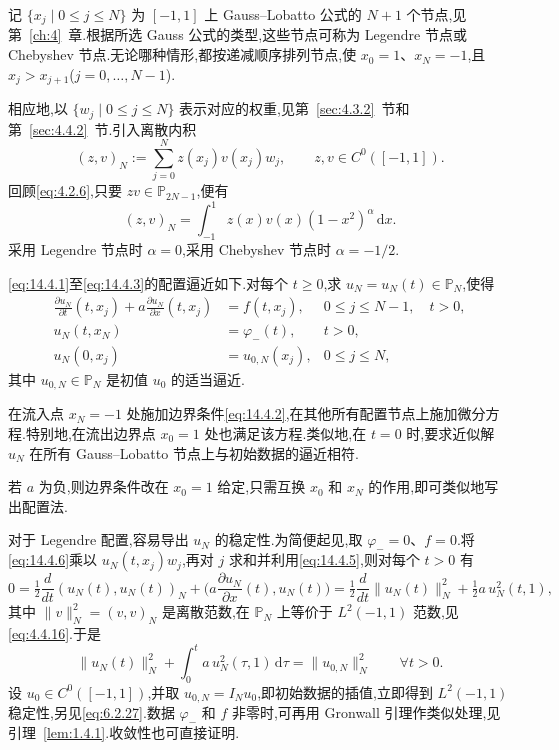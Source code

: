 记 \(\{x_j\mid 0\le j\le N\}\) 为 \([-1,1]\) 上 Gauss--Lobatto 公式的 \(N+1\) 个节点,见第~\ref{ch:4}~章.根据所选 Gauss 公式的类型,这些节点可称为 Legendre 节点或 Chebyshev 节点.无论哪种情形,都按递减顺序排列节点,使 \(x_0=1\)、\(x_N=-1\),且 \(x_j>x_{j+1}\)(\(j=0,\ldots,N-1\)).

相应地,以 \(\{w_j\mid 0\le j\le N\}\) 表示对应的权重,见第~\ref{sec:4.3.2}~节和第~\ref{sec:4.4.2}~节.引入离散内积
\begin{equation}\label{eq:14.4.4}
  (z,v)_N:=\sum_{j=0}^N z(x_j)v(x_j)w_j,\qquad z,v\in C^0([-1,1]).
\end{equation}
回顾\eqref{eq:4.2.6},只要 \(zv\in\mathbb P_{2N-1}\),便有
\begin{equation}\label{eq:14.4.5}
  (z,v)_N=\int_{-1}^1 z(x)v(x)(1-x^2)^\alpha\,\mathrm dx.
\end{equation}
采用 Legendre 节点时 \(\alpha=0\),采用 Chebyshev 节点时 \(\alpha=-1/2\).

\eqref{eq:14.4.1}至\eqref{eq:14.4.3}的配置逼近如下.对每个 \(t\ge0\),求 \(u_N=u_N(t)\in\mathbb P_N\),使得
\begin{align}
  \frac{\partial u_N}{\partial t}(t,x_j)
       +a\frac{\partial u_N}{\partial x}(t,x_j)&=f(t,x_j),
          &0\le j\le N-1,\quad t>0,\label{eq:14.4.6}\\
  u_N(t,x_N)&=\varphi_-(t), &t>0,\label{eq:14.4.7}\\
  u_N(0,x_j)&=u_{0,N}(x_j), &0\le j\le N,\label{eq:14.4.8}
\end{align}
其中 \(u_{0,N}\in\mathbb P_N\) 是初值 \(u_0\) 的适当逼近.

在流入点 \(x_N=-1\) 处施加边界条件\eqref{eq:14.4.2},在其他所有配置节点上施加微分方程.特别地,在流出边界点 \(x_0=1\) 处也满足该方程.类似地,在 \(t=0\) 时,要求近似解 \(u_N\) 在所有 Gauss--Lobatto 节点上与初始数据的逼近相符.

若 \(a\) 为负,则边界条件改在 \(x_0=1\) 给定,只需互换 \(x_0\) 和 \(x_N\) 的作用,即可类似地写出配置法.

对于 Legendre 配置,容易导出 \(u_N\) 的稳定性.为简便起见,取 \(\varphi_-=0\)、\(f=0\).将\eqref{eq:14.4.6}乘以 \(u_N(t,x_j)w_j\),再对 \(j\) 求和并利用\eqref{eq:14.4.5},则对每个 \(t>0\) 有
\[
  0=\tfrac12\frac{d}{dt}(u_N(t),u_N(t))_N
        +\biggl(a\frac{\partial u_N}{\partial x}(t),u_N(t)\biggr)
    =\tfrac12\frac{d}{dt}\|u_N(t)\|_N^2+\tfrac12a\,u_N^2(t,1),
\]
其中 \(\|v\|_N^2=(v,v)_N\) 是离散范数,在 \(\mathbb P_N\) 上等价于 \(L^2(-1,1)\) 范数,见\eqref{eq:4.4.16}.于是
\[
  \|u_N(t)\|_N^2+\int_0^t a\,u_N^2(\tau,1)\,\mathrm d\tau
      =\|u_{0,N}\|_N^2\qquad\forall t>0.
\]
设 \(u_0\in C^0([-1,1])\),并取 \(u_{0,N}=I_Nu_0\),即初始数据的插值,立即得到 \(L^2(-1,1)\) 稳定性,另见\eqref{eq:6.2.27}.数据 \(\varphi_-\) 和 \(f\) 非零时,可再用 Gronwall 引理作类似处理,见引理~\ref{lem:1.4.1}.收敛性也可直接证明.

